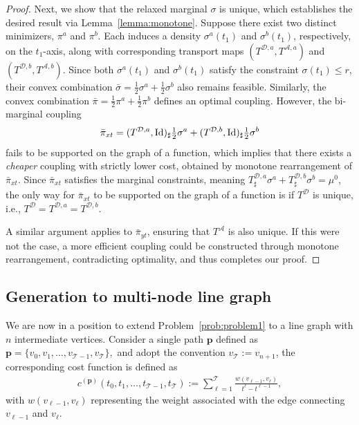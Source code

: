 \documentclass[11pt]{article}
\newcommand{\calT}{{\mathcal T}}
\newcommand{\A}{\mathcal A}
\newcommand{\D}{\mathcal D}
\begin{document}
\begin{proof}
Next, we show that the relaxed marginal $\sigma$ is unique, which establishes the desired result via Lemma~\ref{lemma:monotone}. Suppose there exist two distinct minimizers, $\pi^a$ and $\pi^b$. Each induces a density $\sigma^a(t_1)$ and $\sigma^b(t_1)$, respectively, on the $t_1$-axis, along with corresponding transport maps $(T^{\D,a}, T^{\A,a})$ and $(T^{\D,b}, T^{\A,b})$. Since both $\sigma^a(t_1)$ and $\sigma^b(t_1)$ satisfy the constraint $\sigma(t_1) \leq r$, their convex combination $\bar \sigma = \frac{1}{2} \sigma^a + \frac{1}{2} \sigma^b$
also remains feasible. Similarly, the convex combination
$\bar \pi = \frac{1}{2} \pi^a + \frac{1}{2} \pi^b$
defines an optimal coupling. However, the bi-marginal coupling
\begin{align*}
\bar \pi_{xt} = (T^{\D,a}, {\rm Id})_{\sharp}\tfrac{1}{2} \sigma^a +
(T^{\D,b}, {\rm Id})_{\sharp}\tfrac{1}{2} \sigma^b
\end{align*}
fails to be supported on the graph of a function, which implies that there exists a \emph{cheaper} coupling with strictly lower cost, obtained by monotone rearrangement of $\bar \pi_{xt}$. Since $\bar \pi_{xt}$ satisfies the marginal constraints, meaning
$T^{\D,a}_{\sharp} \sigma^a + T^{\D,b}_{\sharp} \sigma^b = \mu^0$, the only way for $\bar \pi_{xt}$ to be supported on the graph of a function is if $T^\D$ is unique, i.e., $T^{\D} = T^{\D,a} = T^{\D,b}$.

A similar argument applies to $\bar \pi_{yt}$, ensuring that $T^\A$ is also unique. If this were not the case, a more efficient coupling could be constructed through monotone rearrangement, contradicting optimality, and thus completes our proof.
\end{proof}


\subsection{Generation to multi-node line graph}

We are now in a position to extend Problem~\ref{prob:problem1} to a line graph with $n$ intermediate vertices. Consider a single path $\mathbf p$ defined as
$
\mathbf p = \{v_0, v_1, \dots, v_{\calT-1}, v_\calT\},
$
and adopt the convention $v_\calT := v_{n+1}$, the corresponding cost function is defined as
\begin{align}\label{eq:cost}
c^{(\mathbf{p})}(t_0, t_1, \dots, t_{\calT-1}, t_\calT) := \sum_{\ell=1}^{\calT}
\frac{w(v_{\ell-1}, v_\ell)}{t^\ell - t^{\ell-1}},
\end{align}
with $w(v_{\ell-1}, v_\ell)$ representing the weight associated with the edge connecting $v_{\ell-1}$ and $v_\ell$.
\end{document}
